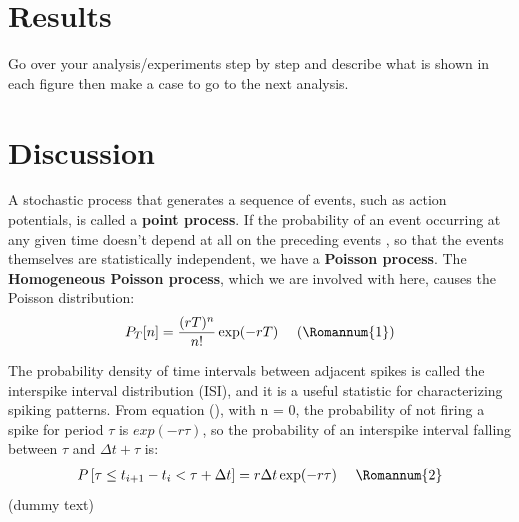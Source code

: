 \documentclass[9pt,twocolumn]{paper-template}
\begin{document}
\section*{Results}
Go over your analysis/experiments step by step and
describe what is shown in each figure then make a case
to go to the next analysis.\\


\section*{Discussion}
A stochastic process that generates a sequence of events, such as action
potentials, is called a \textbf{point process}. If the probability of an event occurring at any given time doesn't depend at all on the preceding events , so that the events themselves are statistically independent, we have a \textbf{Poisson process}. The \textbf{Homogeneous Poisson process}, which we are involved with here, causes the Poisson distribution:
\begin{gather*}
P_{T}[n]=\frac{(r T)^{n}}{n !} \exp (-r T)\ \ \ \ (\Romannum{1})
\end{gather*}

The probability density of time intervals between adjacent spikes is called the interspike interval distribution (ISI), and it is a useful statistic for characterizing spiking patterns. From equation (), with n = 0, the probability of not firing a spike for period $ \tau $ is $ exp(-r\tau) $, so the probability of an interspike interval falling
between $ \tau $ and $ \Delta t + \tau $ is:
\begin{gather*}
P\left[\tau \leq t_{i+1}-t_{i}<\tau+\Delta t\right]=r \Delta t \exp (-r \tau)\ \ \ \ \Romannum{2}
\end{gather*}
(dummy text)\lipsum[1]
\end{document}
